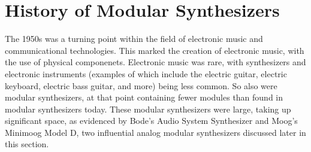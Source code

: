\section[History of Modular Synthesizers]{History of Modular Synthesizers}\label{section:mod-synth-history}

The 1950s was a turning point within the field of electronic music and communicational technologies. This marked the creation of electronic music, with the use of physical componenets. Electronic music was rare, with synthesizers and electronic instruments (examples of which include the electric guitar, electric keyboard, electric bass guitar, and more) being less common. So also were modular synthesizers, at that point containing fewer modules than found in modular synthesizers today. These modular synthesizers were large, taking up significant space, as evidenced by Bode's Audio System Synthesizer and Moog's Minimoog Model D, two influential analog modular synthesizers discussed later in this section.

